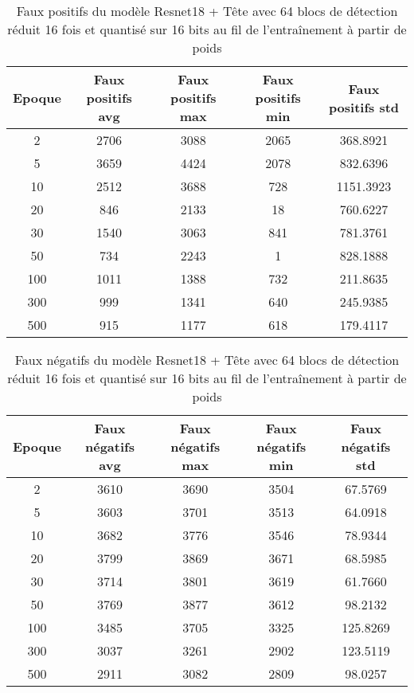 \begin{table}[!ht]
    \caption{Faux positifs du modèle Resnet18 + Tête avec 64 blocs de détection réduit 16 fois et quantisé sur 16 bits au fil de l'entraînement à partir de poids}
    \label{tab:qresnet18+head_64n_reduced_16x_false_positive_16b_from_weights}
    \centering
    \begin{tabular}{ |c||c|c|c|c|  }
        \hline
        \rowcolor{gray!50}
        Epoque & Faux positifs avg & Faux positifs max & Faux positifs min & Faux positifs std\\
        \hline
        2 & 2706 & 3088 & 2065 & 368.8921\\
        5 & 3659 & 4424 & 2078 & 832.6396\\
        10 & 2512 & 3688 & 728 & 1151.3923\\
        20 & 846 & 2133 & 18 & 760.6227\\
        30 & 1540 & 3063 & 841 & 781.3761\\
        50 & 734 & 2243 & 1 & 828.1888\\
        100 & 1011 & 1388 & 732 & 211.8635\\
        300 & 999 & 1341 & 640 & 245.9385\\
        500 & 915 & 1177 & 618 & 179.4117\\
        \hline
    \end{tabular}
\end{table}

\begin{table}[!ht]
    \caption{Faux négatifs du modèle Resnet18 + Tête avec 64 blocs de détection réduit 16 fois et quantisé sur 16 bits au fil de l'entraînement à partir de poids}
    \label{tab:qresnet18+head_64n_reduced_16x_false_negative_16b_from_weights}
    \centering
    \begin{tabular}{ |c||c|c|c|c|  }
        \hline
        \rowcolor{gray!50}
        Epoque & Faux négatifs avg & Faux négatifs max & Faux négatifs min & Faux négatifs std\\
        \hline
        2 & 3610 & 3690 & 3504 & 67.5769\\
        5 & 3603 & 3701 & 3513 & 64.0918\\
        10 & 3682 & 3776 & 3546 & 78.9344\\
        20 & 3799 & 3869 & 3671 & 68.5985\\
        30 & 3714 & 3801 & 3619 & 61.7660\\
        50 & 3769 & 3877 & 3612 & 98.2132\\
        100 & 3485 & 3705 & 3325 & 125.8269\\
        300 & 3037 & 3261 & 2902 & 123.5119\\
        500 & 2911 & 3082 & 2809 & 98.0257\\
        \hline
    \end{tabular}
\end{table}


